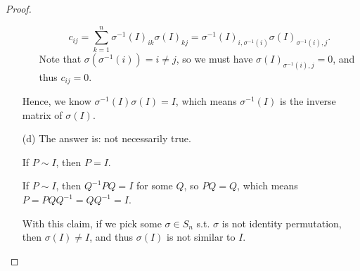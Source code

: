 \begin{proof}
\begin{itemize}
\begin{itemize}
            \[
                c_{ij} = \sum_{k=1}^n \sigma ^{-1}(I)_{ik} \sigma (I)_{kj} = \sigma ^{-1}(I)_{i, \sigma ^{-1}(i)} \sigma (I)_{\sigma ^{-1}(i), j}. 
            \]
            Note that \(\sigma (\sigma^{-1} (i)) = i \neq j\), so we must have \(\sigma (I)_{\sigma ^{-1}(i), j} = 0\), and thus \(c_{ij} = 0\).   
        \end{itemize}
        Hence, we know \(\sigma^{-1} (I) \sigma (I) = I\), which means \(\sigma ^{-1}(I)\) is the inverse matrix of \(\sigma (I)\). 
        \item [(d)] The answer is: not necessarily true. 
        \begin{claim}
            If \(P \sim I\), then \(P = I\).  
        \end{claim}
        \begin{explanation}
            If \(P \sim I\), then \(Q^{-1} P Q = I\) for some \(Q\), so \(PQ = Q\), which means \(P = PQQ^{-1} = QQ^{-1} = I\).     
        \end{explanation}
        With this claim, if we pick some \(\sigma \in S_n\) s.t. \(\sigma \) is not identity permutation, then \(\sigma (I) \neq I\), and thus \(\sigma (I)\) is not similar to \(I\). 
    \end{itemize}
    
\end{proof}

